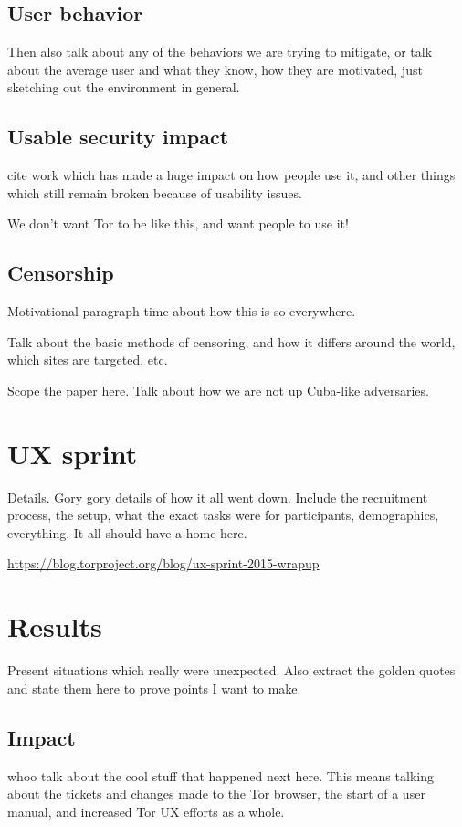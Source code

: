 \documentclass{sig-alternate-hotpets15}
\begin{document}
\subsection{User behavior}
Then also talk about any of the behaviors we are trying to mitigate,
or talk about the average user and what they know, how they are motivated,
just sketching out the environment in general. 

\subsection{Usable security impact} 
cite work which has made a huge impact on how people use it, and 
other things which still remain broken because of usability issues. 

We don't want Tor to be like this, and want people to use it!

\subsection{Censorship} 
Motivational paragraph time about how this is so everywhere. 

Talk about the basic methods of censoring, and how it differs 
around the world, which sites are targeted, etc. 

Scope the paper here. Talk about how we are not up Cuba-like adversaries. 

\section{UX sprint} 
Details. Gory gory details of how it all went down. 
Include the recruitment process, the setup, what the exact 
tasks were for participants, demographics, everything. 
It all should have a home here. 

\url{https://blog.torproject.org/blog/ux-sprint-2015-wrapup}

\section{Results}
Present situations which really were unexpected. 
Also extract the golden quotes and state them here 
to prove points I want to make.  

\subsection{Impact}
whoo talk about the cool stuff that happened next here. 
This means talking about the tickets and changes made 
to the Tor browser, the start of a user manual, and 
increased Tor UX efforts as a whole.
\end{document}
